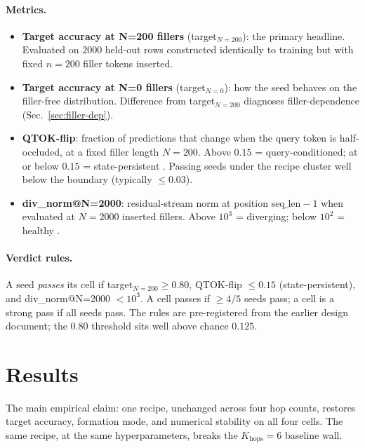 \documentclass[11pt]{article}
\begin{document}
\paragraph{Metrics.}

\begin{itemize}
\item \textbf{Target accuracy at N=200 fillers} (target$_{N=200}$):
      the primary headline. Evaluated on $2000$ held-out rows
      constructed identically to training but with fixed $n = 200$
      filler tokens inserted.
\item \textbf{Target accuracy at N=0 fillers} (target$_{N=0}$):
      how the seed behaves on the filler-free distribution.
      Difference from target$_{N=200}$ diagnoses
      filler-dependence (Sec.~\ref{sec:filler-dep}).
\item \textbf{QTOK-flip}: fraction of predictions that change when
      the query token is half-occluded, at a fixed filler length
      $N = 200$. Above $0.15$ = query-conditioned; at or below
      $0.15$ = state-persistent \citep{fenrir2026}. Passing seeds
      under the recipe cluster well below the boundary (typically
      $\le 0.03$).
\item \textbf{div\_norm@N=2000}: residual-stream norm at position
      $\mathrm{seq\_len} - 1$ when evaluated at $N = 2000$ inserted
      fillers. Above $10^3$ = diverging; below $10^2$ = healthy
      \citep{fenrir2026}.
\end{itemize}

\paragraph{Verdict rules.} A seed \emph{passes} its cell if
target$_{N=200} \ge 0.80$, QTOK-flip $\le 0.15$
(state-persistent), and div\_norm@N=2000 $< 10^3$. A cell passes
if $\ge 4/5$ seeds pass; a cell is a strong pass if all seeds
pass. The rules are pre-registered from the earlier design
document; the $0.80$ threshold sits well above chance $0.125$.

\section{Results}
\label{sec:results}

The main empirical claim: one recipe, unchanged across four hop
counts, restores target accuracy, formation mode, and numerical
stability on all four cells. The same recipe, at the same
hyperparameters, breaks the $K_{\mathrm{hops}} = 6$ baseline wall.
\end{document}
